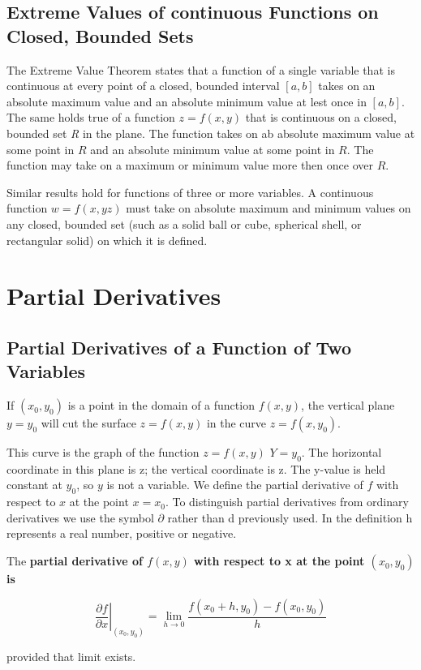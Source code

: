 \documentclass[12pt,a4paper,draft]{article}
\newenvironment{definition}{\begin{definitionbox}}{\end{definitionbox}\vspace{1\baselineskip}}
\begin{document}
\subsection{Extreme Values of continuous Functions on Closed, Bounded Sets}

The Extreme Value Theorem states that a function of a single variable that is continuous at every point of a closed, bounded interval \([a,b]\) takes on an absolute maximum value and an absolute minimum value at lest once  in \([a,b]\). The same holds true of a function \(z = f(x,y)\) that is continuous on a closed, bounded set \textit{R} in the plane. The function takes on ab absolute maximum value at some point in \(R\) and an absolute minimum value at some point in \(R\).
The function may take on a maximum or minimum value more then once over \(R\). 

Similar results hold for functions of three or more variables. A continuous function \(w = f(x,yz)\) must take on absolute maximum and minimum values on any closed, bounded set (such as a solid ball or cube, spherical shell, or rectangular solid) on which it is defined.

\section{Partial Derivatives}

\subsection{Partial Derivatives of a Function of Two Variables}

If \((x_0,y_0)\) is a point in the domain of a function \(f(x,y)\), the vertical plane \(y=y_0\) will cut the surface \(z = f(x,y)\) in the curve \(z = f(x,y_0)\).
 
This curve is the graph of the function \(z = f(x,y)\) \(Y = y_0\). The horizontal coordinate in this plane is z; the vertical coordinate is z. The y-value is held constant at \(y_0\), so \(y\) is not a variable.
We define the partial derivative of \(f\) with respect to \(x\) at the point \(x = x_0\). To distinguish partial derivatives from ordinary derivatives we use the symbol \(\partial\) rather than d previously used. In the definition h represents a real number, positive or negative.

\begin{definition}
    The \textbf{partial derivative of \(f(x,y)\) with respect to x at the point \((x_0,y_0)\) is}

    \[\left. \frac{\partial f}{\partial x} \right|_{(x_0, y_0)} = \lim_{h \to 0}\frac{f(x_0+h,y_0)-f(x_0,y_0)}{h}\]

    provided that limit exists.


\end{definition}
\end{document}
